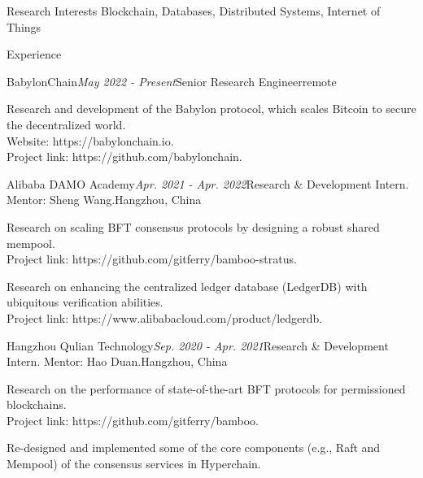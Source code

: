 \documentclass{resume} %
\begin{document}
\begin{rSection}{Research Interests}
Blockchain, Databases, Distributed Systems, Internet of Things
\end{rSection}


\begin{rSection}{Experience}

\begin{rSubsection}{BabylonChain}{\em May 2022 - Present}{Senior Research Engineer}{remote}
\item Research and development of the Babylon protocol, which scales Bitcoin to secure the decentralized world.
\\Website: https://babylonchain.io.
\\Project link: https://github.com/babylonchain.
\end{rSubsection}

\begin{rSubsection}{Alibaba DAMO Academy}{\em Apr. 2021 - Apr. 2022}{Research \& Development Intern. Mentor: Sheng Wang.}{Hangzhou, China}
\item Research on scaling BFT consensus protocols by designing a robust shared mempool.
\\Project link: https://github.com/gitferry/bamboo-stratus.
\item Research on enhancing the centralized ledger database (LedgerDB) with ubiquitous verification abilities.
\\Project link: https://www.alibabacloud.com/product/ledgerdb.
\end{rSubsection}


\begin{rSubsection}{Hangzhou Qulian Technology}{\em Sep. 2020 - Apr. 2021}{Research \& Development Intern. Mentor: Hao Duan.}{Hangzhou, China}
\item Research on the performance of state-of-the-art BFT protocols for permissioned blockchains.
\\Project link: https://github.com/gitferry/bamboo.
\item Re-designed and implemented some of the core components (e.g., Raft and Mempool) of the consensus services in Hyperchain.
\end{rSubsection}


\end{rSection}
\end{document}
